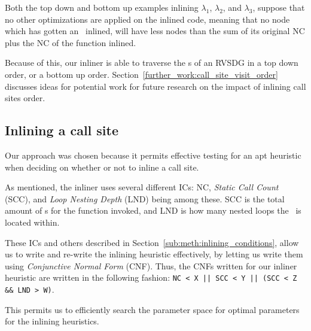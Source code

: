 Both the top down and bottom up examples inlining $\lambda_1$, $\lambda_2$, and
$\lambda_3$, suppose that no other optimizations are applied on the inlined
code, meaning that no node which has gotten an \applyNode~inlined, will have
less nodes than the sum of its original NC plus the NC of the function inlined.

Because of this, our inliner is able to traverse the \applyNode s of an RVSDG in
a top down order, or a bottom up order.
Section~\ref{further_work:call_site_visit_order} discusses ideas for potential
work for future research on the impact of inlining call sites order.

\subsection{Inlining a call site}
\label{sub:scheme:inlining_apply_nodes}

Our approach was chosen because it permits effective testing for an apt
heuristic when deciding on whether or not to inline a call site.

As mentioned, the inliner uses several different ICs: NC, \textit{Static Call
Count} (SCC), and \textit{Loop Nesting Depth} (LND) being among these. SCC is
the total amount of \applyNode s for the function invoked, and LND is how many
nested loops the \applyNode~is located within.

These ICs and others described in Section~\ref{sub:meth:inlining_conditions},
allow us to write and re-write the inlining heuristic effectively, by letting us
write them using \textit{Conjunctive Normal Form} (CNF). Thus, the CNFs written
for our inliner heuristic are written in the following fashion:
\lstinline"NC < X || SCC < Y || (SCC < Z && LND > W)".

This permits us to efficiently search the parameter space for optimal parameters
for the inlining heuristics.

